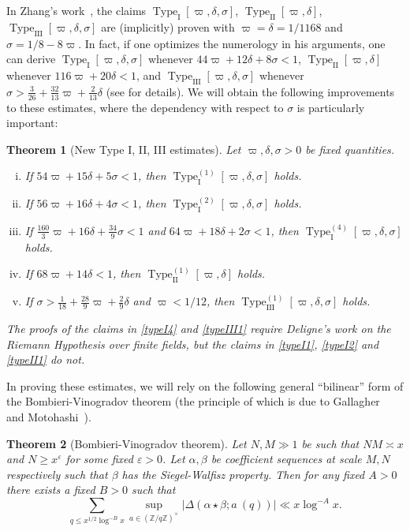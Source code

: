 \documentclass[12pt,a4paper,reqno]{amsart}
\numberwithin{equation}{section}
\theoremstyle{plain}
\newtheorem{theorem}{Theorem}[section]
\theoremstyle{definition}
\newcommand\Z{\mathbb{Z}}
\newcommand\eps{\varepsilon}
\newcommand\TypeI{\operatorname{Type}_{\operatorname{I}}}
\newcommand\TypeII{\operatorname{Type}_{\operatorname{II}}}
\newcommand\TypeIII{\operatorname{Type}_{\operatorname{III}}}
\renewcommand{\sim}{\asymp}
\begin{document}
In Zhang's work~\cite{zhang}, the claims
$\TypeI[\varpi,\delta,\sigma]$, $\TypeII[\varpi,\delta]$,$
\TypeIII[\varpi,\delta,\sigma]$ are (implicitly) proven with
$\varpi=\delta=1/1168$ and $\sigma = 1/8 - 8 \varpi$.  In fact, if one
optimizes the numerology in his arguments, one can derive
$\TypeI[\varpi,\delta,\sigma]$ whenever $44 \varpi + 12\delta + 8
\sigma < 1$, $\TypeII[\varpi,\delta]$ whenever $116\varpi+20\delta <
1$, and $\TypeIII[\varpi,\delta,\sigma]$ whenever $\sigma >
\frac{3}{26} + \frac{32}{13}\varpi + \frac{2}{13}\delta$ (see
\cite{pintz} for details).  We will obtain the following improvements
to these estimates, where the dependency with respect to $\sigma$ is
particularly important:

\begin{theorem}[New Type I, II, III estimates]\label{newtype} Let
  $\varpi,\delta,\sigma > 0$ be fixed quantities.
\begin{enumerate}[(i)]
\item\label{typeI1} If $54\varpi + 15\delta + 5 \sigma < 1$, then $\TypeI^{(1)}[\varpi,\delta,\sigma]$ holds.
\item\label{typeI2}  If $56\varpi + 16\delta + 4 \sigma < 1$, then $\TypeI^{(2)}[\varpi,\delta,\sigma]$ holds.
\item\label{typeI4} If $\frac{160}{3} \varpi + 16\delta + \frac{34}{9} \sigma < 1$ and $64\varpi + 18 \delta + 2\sigma < 1$, then $\TypeI^{(4)}[\varpi,\delta,\sigma]$ holds.
\item\label{typeII1}  If $68\varpi + 14 \delta < 1$, then $\TypeII^{(1)}[\varpi,\delta]$ holds.
\item\label{typeIII1} If $\sigma > \frac{1}{18}  + \frac{28}{9} \varpi + \frac{2}{9} \delta$ and $\varpi<1/12$, then $\TypeIII^{(1)}[\varpi,\delta,\sigma]$ holds.
\end{enumerate}
The proofs of the claims in \eqref{typeI4} and \eqref{typeIII1}
require Deligne's work on the Riemann Hypothesis over finite fields,
but the claims in \eqref{typeI1}, \eqref{typeI2} and \eqref{typeII1}
do not.
\end{theorem}

In proving these estimates, we will rely on the following general
``bilinear'' form of the Bombieri-Vinogradov theorem (the principle of
which is due to Gallagher~\cite{gallagher} and
Motohashi~\cite{motohashi}).

\begin{theorem}[Bombieri-Vinogradov theorem]\label{bvt}  Let $N,M \gg
  1$ be such that $NM \sim x$ and $N \geq x^\eps$ for some fixed
  $\eps>0$.  Let $\alpha,\beta$ be coefficient sequences at scale
  $M,N$ respectively such that $\beta$ has the Siegel-Walfisz property.  Then for any fixed $A>0$ there exists a fixed $B>0$ such that
$$ \sum_{q \leq x^{1/2} \log^{-B} x} \sup_{a \in (\Z/q\Z)^\times} 
|\Delta(\alpha\star\beta; a\ (q))| \ll x \log^{-A} x.$$
\end{theorem}
\end{document}
